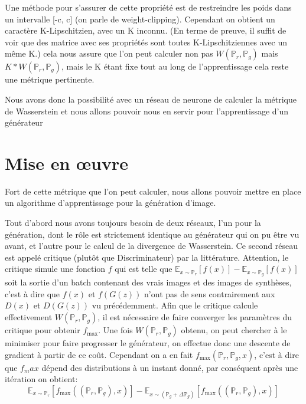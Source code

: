Une méthode pour s'assurer de cette propriété est de restreindre les poids dans un intervalle [-c, c] (on parle de weight-clipping). Cependant on obtient un caractère K-Lipschitzien, avec un K inconnu. (En terme de preuve, il suffit de voir que des matrice avec ses propriétés sont toutes K-Lipschitziennes avec un même K.) cela nous assure que l'on peut calculer non pas $W(\mathbb{P}_r, \mathbb{P}_g)$ mais $K*W(\mathbb{P}_r, \mathbb{P}_g)$, mais le K étant fixe tout au long de l'apprentissage cela reste une métrique pertinente. 

Nous avons donc la possibilité avec un réseau de neurone de calculer la métrique de Wasserstein et nous allons pouvoir nous en servir pour l'apprentissage d'un générateur

\section{Mise en œuvre}

Fort de cette métrique que l'on peut calculer, nous allons pouvoir mettre en place un algorithme d'apprentissage pour la génération d'image.

Tout d'abord nous avons toujours besoin de deux réseaux, l'un pour la génération, dont le rôle est strictement identique au générateur qui on pu être vu avant, et l'autre pour le calcul de la divergence de Wasserstein. Ce second réseau est appelé critique (plutôt que Discriminateur) par la littérature. Attention, le critique simule une fonction $f$ qui est telle que $\mathbb{E}_{x\sim\mathbb{P}_r}[f(x)] - \mathbb{E}_{x\sim\mathbb{P}_g}[f(x)] $ soit la sortie d'un batch contenant des vrais images et des images de synthèses, c'est à dire que $f(x)$ et $f(G(z))$ n'ont pas de sens contrairement aux $D(x)$ et $D(G(z))$ vu précédemment. 
Afin que le critique calcule effectivement $W(\mathbb{P}_r, \mathbb{P}_g)$, il est nécessaire de faire converger les paramètres du critique pour obtenir $f_{\text{max}}$. Une fois $W(\mathbb{P}_r, \mathbb{P}_g)$ obtenu, on peut chercher à le minimiser pour faire progresser le générateur, on effectue donc une descente de gradient à partir de ce coût. Cependant on a en fait $f_{\text{max}}(\mathbb{P}_r, \mathbb{P}_g, x)$, c'est à dire que $f_max$ dépend des distributions à un instant donné, par conséquent après une itération on obtient:
 \[\mathbb{E}_{x\sim\mathbb{P}_r}[f_\text{max}((\mathbb{P}_r, \mathbb{P}_g), x)] - \mathbb{E}_{x\sim\left(\mathbb{P}_g+\Delta\mathbb{P}_g\right)}[f_\text{max}((\mathbb{P}_r, \mathbb{P}_g), x)] \]

